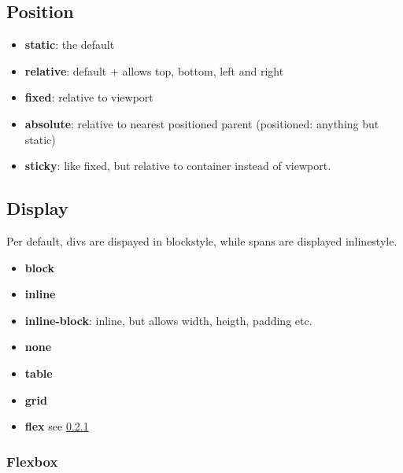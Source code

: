 \subsection{Position}
\begin{itemize}
    \item \textbf{static}: the default
    \item \textbf{relative}: default + allows top, bottom, left and right
    \item \textbf{fixed}: relative to viewport
    \item \textbf{absolute}: relative to nearest positioned parent (positioned: anything but static)
    \item \textbf{sticky}: like fixed, but relative to container instead of viewport.
\end{itemize}

\subsection{Display}
Per default, divs are dispayed in blockstyle, while spans are displayed inlinestyle.
\begin{itemize}
    \item \textbf{block}
    \item \textbf{inline}
    \item \textbf{inline-block}: inline, but allows width, heigth, padding etc.
    \item \textbf{none}
    \item \textbf{table}
    \item \textbf{grid}
    \item \textbf{flex} see \ref{flexbox}
\end{itemize}

\subsubsection{Flexbox}\label{flexbox}

